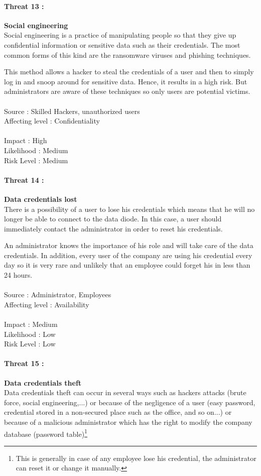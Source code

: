 \documentclass[a4paper,10pt]{article}
\begin{document}
\paragraph{Threat 13 :} \textbf{Social engineering} \\
\indent Social engineering is a practice of manipulating people so that they give up confidential information or sensitive data such as their credentials. The most common forms of this kind are the ransomware viruses and phishing techniques. 

This method allows a hacker to steal the credentials of a user and then to simply log in and snoop around for sensitive data. Hence, it results in a high risk. But administrators are aware of these techniques so only users are potential victims. \\ \\ 
Source : Skilled Hackers, unauthorized users \\
Affecting level : Confidentiality  \\ \\
Impact : High \\
Likelihood : Medium \\
Risk Level : Medium

\paragraph{Threat 14 :} \textbf{Data credentials lost} \\
\indent There is a possibility of a user to lose his credentials which means that he will no longer be able to connect to the data diode. In this case, a user should immediately contact the administrator in order to reset his credentials.

An administrator knows the importance of his role and will take care of the data credentials. In addition, every user of the company are using his credential every day so it is very rare and unlikely that an employee could forget his in less than 24 hours. \\  \\ 
Source : Administrator, Employees  \\
Affecting level : Availability \\ \\
Impact : Medium \\
Likelihood : Low \\
Risk Level : Low

\paragraph{Threat 15 :} \textbf{Data credentials theft} \\
\indent Data credentials theft can occur in several ways such as hackers attacks (brute force, social engineering,...)  or because of the negligence of a user (easy password, credential stored in a non-secured place such as the office, and so on...) or because of a malicious administrator which has the right to modify the company database (password table)\footnote{This is generally in case of any employee lose his credential, the administrator can reset it or change it manually.}
\end{document}
